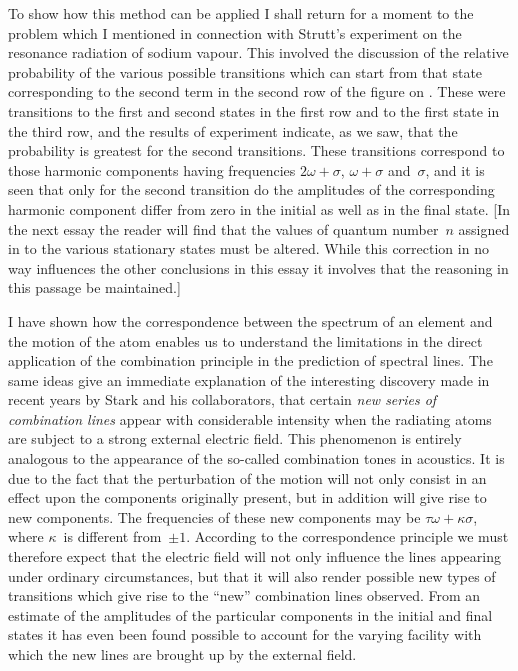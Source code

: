 To show how this method can be applied I shall return for a
moment to the problem which I mentioned in connection with
Strutt's experiment on the resonance radiation of sodium vapour.
This involved the discussion of the relative probability of the various
possible transitions which can start from that state corresponding
to the second term in the second row of the figure on . These
were transitions to the first and second states in the first row and
to the first state in the third row, and the results of experiment
indicate, as we saw, that the probability is greatest for the second
transitions. These transitions correspond to those harmonic components
having frequencies $2\omega + \sigma$, $\omega + \sigma$ and~$\sigma$, and it is seen
that only for the second transition do the amplitudes of the corresponding
harmonic component differ from zero in the initial as
well as in the final state. [In the next essay the reader will find
that the values of quantum number~$n$ assigned in  to the
various stationary states must be altered. While this correction
in no way influences the other conclusions in this essay it involves
that the reasoning in this passage  be maintained.]

I have shown how the correspondence between the spectrum of
an element and the motion of the atom enables us to understand
the limitations in the direct application of the combination principle
in the prediction of spectral lines. The same ideas give an immediate
explanation of the interesting discovery made in recent years
by Stark and his collaborators, that certain \emph{new series of combination
lines} appear with considerable intensity when the radiating
atoms are subject to a strong external electric field. This phenomenon
is entirely analogous to the appearance of the so-called
combination tones in acoustics. It is due to the fact that the
perturbation of the motion will not only consist in an effect upon
the components originally present, but in addition will give rise to
new components. The frequencies of these new components may be
$\tau\omega + \kappa\sigma$, where $\kappa$~is different from~$\pm1$. According to the correspondence
principle we must therefore expect that the electric field will
not only influence the lines appearing under ordinary circumstances,
but that it will also render possible new types of transitions which
give rise to the ``new'' combination lines observed. From an estimate
of the amplitudes of the particular components in the initial
and final states it has even been found possible to account for the
varying facility with which the new lines are brought up by the
external field.

